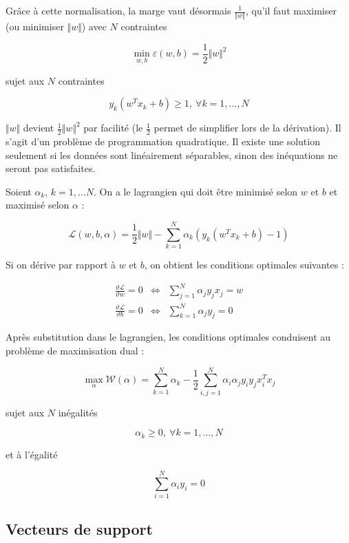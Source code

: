 	Grâce à cette normalisation, la marge vaut désormais $\frac{1}{\Vert w \Vert}$, qu'il faut maximiser (ou minimiser $\Vert w \Vert$) avec $N$ contraintes
		
	$$\min_{w, b} \varepsilon(w, b) = \frac{1}{2} \Vert w \Vert^2$$
	
	sujet aux $N$ contraintes
	
	$$y_k(w^T x_k + b) \geq 1, \: \forall k = 1, \dots , N$$

	$\Vert w \Vert$ devient $\frac{1}{2} \Vert w \Vert^2$ par facilité (le $\frac{1}{2}$ permet de simplifier lors de la dérivation). Il s'agit d'un problème de programmation quadratique. Il existe une solution seulement si les données sont linéairement séparables, sinon des inéquations ne seront pas satisfaites.
	
	
	Soient $\alpha_k$, $k = 1, \dots N$. On a le lagrangien qui doit être minimisé selon $w$ et $b$ et maximisé selon $\alpha$ :
	
	$$\mathcal{L}(w, b, \alpha) = \frac{1}{2} \Vert w \Vert - \sum_{k = 1}^N \alpha_k (y_k (w^Tx_k + b) - 1)$$
	
	Si on dérive par rapport à $w$ et $b$, on obtient les conditions optimales suivantes :
	
	\begin{eqnarray*}
	\frac{\vartheta \mathcal{L}}{\vartheta w} = 0 & \Leftrightarrow & \sum_{j = 1}^N \alpha_j y_j x_j = w \\
	\frac{\vartheta \mathcal{L}}{\vartheta b} = 0 & \Leftrightarrow & \sum_{k = 1}^N \alpha_j y_j = 0
	\end{eqnarray*}
	
	Après substitution dans le lagrangien, les conditions optimales conduisent au problème de maximisation dual :
	
	$$\max_{\alpha} \mathcal{W}(\alpha) = \sum_{k = 1}^N \alpha_k - \frac{1}{2} \sum_{i, j = 1}^N \alpha_i \alpha_j y_i y_j x_i^T x_j$$
	
	sujet aux $N$ inégalités
	
	$$\alpha_k \geq 0, \: \forall k = 1, \dots, N$$
	
	et à l'égalité
	
	$$\sum_{i = 1}^N \alpha_i y_i = 0$$
	
	
	\subsection{Vecteurs de support}
	
